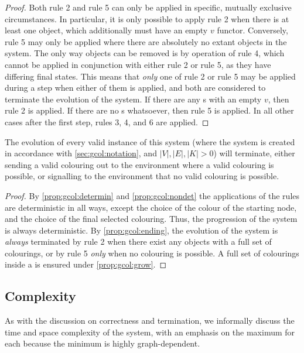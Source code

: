 \begin{proof}
Both rule 2 and rule 5 can only be applied in specific, mutually exclusive circumstances.  In particular, it is only possible to apply rule 2 when there is at least one \bo{} object, which additionally must have an empty \(v\) functor.  Conversely, rule 5 may only be applied where there are absolutely no extant \bo{} objects in the system.  The only way \bo{} objects can be removed is by operation of rule 4, which cannot be applied in conjunction with either rule 2 or rule 5, as they have differing final states.  This means that \emph{only} one of rule 2 or rule 5 may be applied during a step when either of them is applied, and both are considered to terminate the evolution of the system.  If there are any \bo{}s with an empty \(v\), then rule 2 is applied.  If there are no \bo{}s whatsoever, then rule 5 is applied.  In all other cases after the first step, rules 3, 4, and 6 are applied.
\end{proof}

\begin{theorem}
The evolution of every valid instance of this system (where the system is created in accordance with \autoref{sec:gcol:notation}, and \(|V|, |E|, |K| > 0\)) will terminate, either sending a valid colouring out to the environment where a valid colouring is possible, or signalling to the environment that no valid colouring is possible.
\end{theorem}

\begin{proof}
By \autoref{prop:gcol:determin} and \autoref{prop:gcol:nondet} the applications of the rules are deterministic in all ways, except the choice of the colour of the starting node, and the choice of the final selected colouring.  Thus, the progression of the system is always deterministic.  By \autoref{prop:gcol:ending}, the evolution of the system is \emph{always} terminated by rule 2 when there exist any \bo{} objects with a full set of colourings, or by rule 5 \emph{only} when no colouring is possible.  A full set of colourings inside a \bo{} is ensured under \autoref{prop:gcol:grow}.
\end{proof}

\subsection{Complexity}
As with the discussion on correctness and termination, we informally discuss the time and space complexity of the system, with an emphasis on the maximum for each because the minimum is highly graph-dependent.

